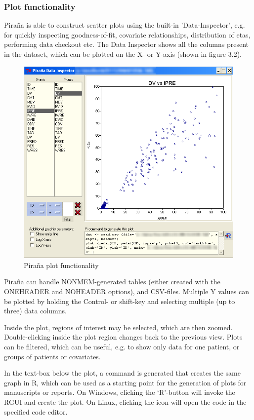 \documentclass[a4,11pt]{report} \usepackage[pdftex]{graphicx}
\begin{document}
{{\subsubsection*{Plot functionality} Pira\~na is able to construct
scatter plots using the built-in 'Data-Inspector', e.g. for quickly
inspecting goodness-of-fit, covariate relationships, distribution of
etas, performing data checkout etc. The Data Inspector shows all the
columns present in the dataset, which can be plotted on the X- or
Y-axis (shown in figure 3.2).
\begin{figure}[hbt] \centering
    \includegraphics[scale=0.3]{images/plot.png}
    \caption{Pira\~na plot functionality}
\end{figure} Pira\~na can handle NONMEM-generated tables (either created with the
ONEHEADER and NOHEADER options), and CSV-files. Multiple Y values can
be plotted by holding the Control- or shift-key and selecting multiple
(up to three) data columns.

Inside the plot, regions of interest may be selected, which are
then zoomed. Double-clicking inside the plot region changes
back to the previous view. Plots can be filtered, which can be useful,
e.g. to show only data for one patient, or groups of patients or
covariates.

In the text-box below the plot, a command is generated that creates
the same graph in R, which can be used as a starting point for the
generation of plots for manuscripts or reports. On Windows, clicking the
`R'-button will invoke the RGUI and create the plot. On Linux,
clicking the icon will open the code in the specified code editor.

}}
\end{document}
